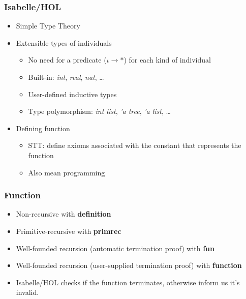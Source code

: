 \documentclass{beamer}
\begin{document}
  \begin{frame}
    \frametitle{Isabelle/HOL}
    \begin{itemize}
      \item Simple Type Theory
      \item Extensible types of individuals
      \begin{itemize}
        \item No need for a predicate ($\iota \rightarrow *$) for each kind of individual
        \item Built-in: \textit{int}, \textit{real}, \textit{nat}, \ldots
        \item User-defined inductive types
        \item Type polymorphism: \textit{int list}, \textit{'a tree}, \textit{'a list}, \ldots
      \end{itemize}
      \item Defining function
      \begin{itemize}
        \item STT: define axioms associated with the constant that represents the function
        \item Also mean programming
      \end{itemize}
    \end{itemize}
  \end{frame}

  \begin{frame}
    \frametitle{Function}
    \begin{itemize}
      \item Non-recursive with \textbf{definition}
      \item Primitive-recursive with \textbf{primrec}
      \item Well-founded recursion (automatic termination proof) with \textbf{fun}
      \item Well-founded recursion (user-supplied termination proof) with \textbf{function}
      \item Isabelle/HOL checks if the function terminates, otherwise inform us it's invalid.
    \end{itemize}
  \end{frame}
\end{document}
